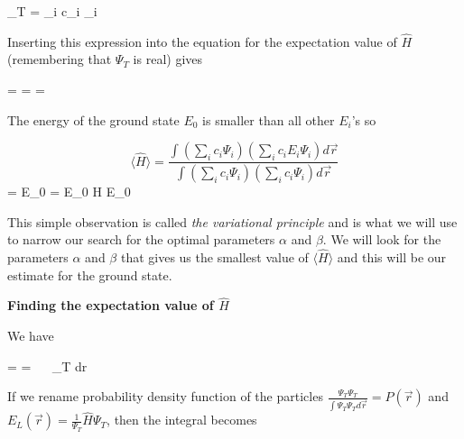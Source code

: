 \eqs
\Psi_T = \sum_i c_i \Psi_i
\eqf

Inserting this expression into the equation for the expectation value of $\hat{H}$ (remembering that $\Psi_T$ is real) gives

\eqs
\langle {} \rangle =  = 
=
\eqf

The energy of the ground state $E_0$ is smaller than all other $E_i$'s so 

\[
\langle \hat{H} \rangle
=
\frac{\int \left ( \sum_i c_i \Psi_i \right ) \left ( \sum_i c_i  E_i \Psi_i \right ) d\vec r}{ \int \left ( \sum_i c_i \Psi_i \right ) \left ( \sum_i c_i \Psi_i \right ) d\vec r}
\]
\eqs
\geq
{}
=
E_0
 = E_0
\eqf
\eqs
\langle H \rangle \geq E_0
\eqf

This simple observation is called \textit{the variational principle} and is what we will use to narrow our search for the optimal parameters $\alpha$ and $\beta$.
We will look for the parameters $\alpha$ and $\beta$ that gives us the smallest value of $\langle \hat{H} \rangle$ and this will be our estimate for the ground state.

\vspace{0.5cm}
\textbf{Finding the expectation value of $\hat{H}$}

We have

\eqs
\langle {} \rangle =  
=
\int ~~   \Psi_T d\vec r
\eqf

If we rename probability density function of the particles $\frac{\Psi_T \Psi_T}{\int \Psi_T \Psi_T d\vec r} = P(\vec r)$ and $E_L(\vec r) = \frac{1}{\Psi_T} \hat{H} \Psi_T$, then the integral becomes 


